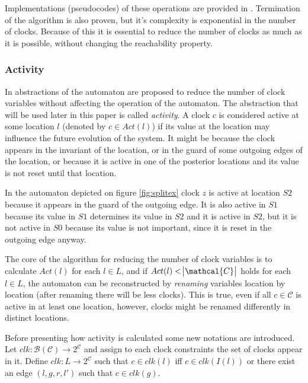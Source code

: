 Implementations (pseudocodes) of these operations are provided in \cite{bengtsson2004timed}. Termination of the algorithm is also proven, but it's complexity is exponential in the number of clocks. Because of this it is essential to reduce the number of clocks as much as it is possible, without changing the reachability property.

\subsubsection{Activity} \label{sec:acitivity}

In \cite{RSS96*73} abstractions of the automaton are proposed to reduce the number of clock variables without affecting the operation of the automaton. The abstraction that will be used later in this paper is called \emph{activity}. A clock $c$ is considered active  at some location $l$ (denoted by $c \in Act(l)$) if its value  at the location may influence the future evolution of the system. It might be because the clock appears in the invariant of the location, or in the guard of some outgoing edges of the location, or because it is active in one of the posterior locations and its value is not reset until that location.
\begin{example}
In the automaton depicted on figure \ref{fig:splitex} clock $z$ is active at location $S2$ because it appears in the guard of the outgoing edge. It is also active in $S1$ because its value in $S1$ determines its value in $S2$ and it is active in $S2$, but it is not active in $S0$ because its value is not important, since it is reset in the outgoing edge anyway.
\end{example}
The core of the algorithm for reducing the number of clock variables is to calculate $Act(l)$ for each $l \in L$, and if $Act(l)<\abs{\mathcal{C}}$ holds for each $l \in L$, the automaton can be reconstructed by \emph{renaming} variables location by location (after renaming there will be less clocks). This is true, even if all $c \in \mathcal{C}$ is active in at least one location, however, clocks might be renamed differently in distinct locations.

Before presenting how activity is calculated some new notations are introduced. Let $clk: \mathcal{B}(\mathcal{C}) \to 2^\mathcal{C}$ and assign to each clock constraints the set of clocks appear in it. Define $clk:L \to  2^\mathcal{C}$ such that $c \in clk(l)$ iff $c \in clk(I(l))$ or there exist an edge $(l,g,r,l')$ such that $c \in clk(g)$.

